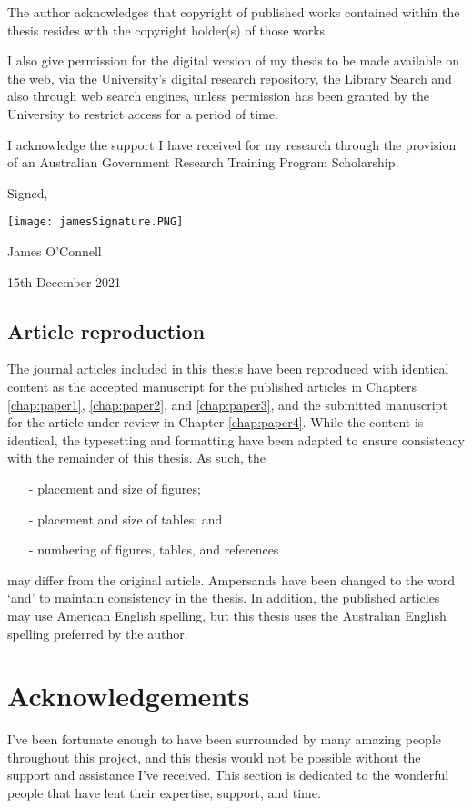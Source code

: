 The author acknowledges that copyright of published works contained within the thesis resides with the copyright holder(s) of those works.

I also give permission for the digital version of my thesis to be made available on the web, via the University’s digital research repository, the Library Search and also through web search engines, unless permission has been granted by the University to restrict access for a period of
time.

I acknowledge the support I have received for my research through the provision of an Australian Government Research Training Program
Scholarship.

\vspace{1cm}

\noindent Signed,

\noindent \texttt{[image: jamesSignature.PNG]}

\noindent James O'Connell

\noindent 15th December 2021


\section*{Article reproduction}
The journal articles included in this thesis have been reproduced with identical content as the accepted manuscript for the published articles in Chapters \ref{chap:paper1}, \ref{chap:paper2}, and \ref{chap:paper3}, and the submitted manuscript for the article under review in Chapter \ref{chap:paper4}. While the content is identical, the typesetting and formatting have been adapted to ensure consistency with the remainder of this thesis. As such, the
\begin{itemize}
    \item[-] placement and size of figures;
    \item[-] placement and size of tables; and
    \item[-] numbering of figures, tables, and references
\end{itemize}
may differ from the original article. Ampersands have been changed to the word `and' to maintain consistency in the thesis. In addition, the published articles may use American English spelling, but this thesis uses the Australian English spelling preferred by the author.

\newpage
\chapter*{Acknowledgements}
I've been fortunate enough to have been surrounded by many amazing people throughout this project, and this thesis would not be possible without the support and assistance I've received. This section is dedicated to the wonderful people that have lent their expertise, support, and time.

